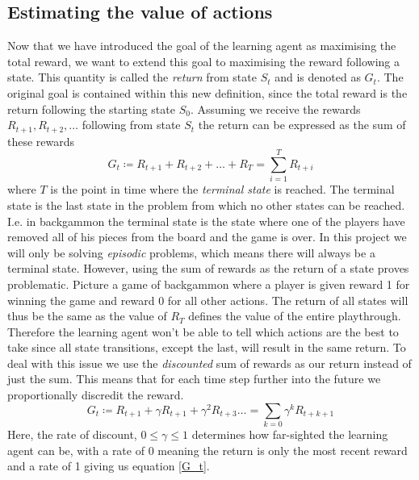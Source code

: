 \documentclass[11pt]{article}
\begin{document}
\maketitle


\subsection{Estimating the value of actions}\label{est_vals}

Now that we have introduced the goal of the learning agent as
maximising the total reward, we want to extend this goal to
maximising the reward following a state.
This quantity is called the \textit{return} from state $S_t$ and is
denoted as $G_t$.
The original goal is contained within this new definition, since the total
reward is the return following the starting state $S_0$.
Assuming we receive the rewards $R_{t+1}, R_{t+2}, \dots$ following from state $S_t$
the return can be expressed as the sum of these rewards
\begin{equation}\label{G_t}
    G_t \coloneqq R_{t+1} + R_{t+2} + \hdots + R_{T} = \sum\limits_{i = 1}^T R_{t+i}
\end{equation}
where $T$ is the point in time where the \textit{terminal state} is reached.
The terminal state is the last state in the problem from which
no other states can be reached.
I.e. in backgammon the terminal state is the state where one of the players
have removed all of his pieces from the board and the game is over.
In this project we will only be solving \textit{episodic} problems, which
means there will always be a terminal state.
However, using the sum of rewards as the return of a state proves problematic.
Picture a game of backgammon where a player is given reward 1 for winning the game
and reward 0 for all other actions.
The return of all states will thus be the same
as the value of $R_T$ defines the value of the entire playthrough.
Therefore the learning agent won't be able to tell which actions are the best to take
since all state transitions, except the last, will result in the same return.
To deal with this issue we use the \textit{discounted} sum of rewards as our return instead
of just the sum.
This means that for each time step further into the future
we proportionally discredit the reward.
\begin{equation}\label{gammaG_t}
    G_t \coloneqq R_{t+1} + \gamma R_{t+1} + \gamma^2 R_{t+3} \dots = \sum\limits_{k=0} \gamma^k R_{t+k+1}
\end{equation}
Here, the rate of discount, $ 0 \leq \gamma \leq 1$ determines how far-sighted the learning agent can be,
with a rate of 0 meaning the return is only the most recent reward and a rate of 1 giving us equation \ref{G_t}.
\end{document}

